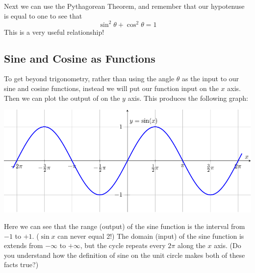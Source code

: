Next we can use the Pythagorean Theorem, and remember that our hypotenuse is equal to one to see that
\[ \sin^2 \theta + \cos^2 \theta = 1 \]
This is a very useful relationship!



\subsection*{Sine and Cosine as Functions} 

To get beyond trigonometry, rather than using the angle $\theta$ as the input to our sine
and cosine functions, instead we will put our function input on the $x$ axis.  Then we can
plot the output of on the $y$ axis.  This produces the following graph:
\begin{center}
    \includegraphics[width=0.85\columnwidth]{figures/0-5-fig5.pdf}
\end{center}


\noindent
Here we can see that the range (output) of the sine function is the interval from $-1$ to
$+1$.  ($\sin x$ can never equal 2!)  The domain (input) of the sine function is extends
from $-\infty$ to $+\infty$, but the cycle repeats every $2 \pi$ along the $x$ axis.  (Do
you understand how the definition of sine on the unit circle makes both of these facts
true?)

